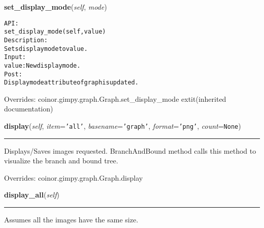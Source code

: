     \vspace{0.5ex}

\hspace{.8\funcindent}\begin{boxedminipage}{\funcwidth}

    \raggedright \textbf{set\_display\_mode}(\textit{self}, \textit{mode})

\setlength{\parskip}{2ex}
\begin{alltt}

API:
    set\_display\_mode(self, value)
Description:
    Sets display mode to value.
Input:
    value: New display mode.
Post:
    Display mode attribute of graph is updated.
\end{alltt}

\setlength{\parskip}{1ex}
      Overrides: coinor.gimpy.graph.Graph.set\_display\_mode 	extit{(inherited documentation)}

    \end{boxedminipage}

    \vspace{0.5ex}

\hspace{.8\funcindent}\begin{boxedminipage}{\funcwidth}

    \raggedright \textbf{display}(\textit{self}, \textit{item}={\tt \texttt{'}\texttt{all}\texttt{'}}, \textit{basename}={\tt \texttt{'}\texttt{graph}\texttt{'}}, \textit{format}={\tt \texttt{'}\texttt{png}\texttt{'}}, \textit{count}={\tt None})

    \vspace{-1.5ex}

    \rule{\textwidth}{0.5\fboxrule}
\setlength{\parskip}{2ex}
    Displays/Saves images requested. BranchAndBound method calls this 
    method to visualize the branch and bound tree.

\setlength{\parskip}{1ex}
      Overrides: coinor.gimpy.graph.Graph.display

    \end{boxedminipage}

    \label{coinor:grumpy:BB:BBTree:display_all}

    \vspace{0.5ex}

\hspace{.8\funcindent}\begin{boxedminipage}{\funcwidth}

    \raggedright \textbf{display\_all}(\textit{self})

    \vspace{-1.5ex}

    \rule{\textwidth}{0.5\fboxrule}
\setlength{\parskip}{2ex}
    Assumes all the images have the same size.

\setlength{\parskip}{1ex}
    \end{boxedminipage}


